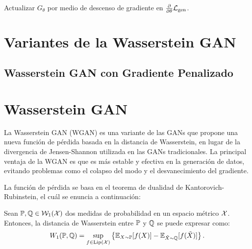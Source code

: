 {{\begin{algorithm}[ht!]
\begin{algorithmic}[1]
        \State Actualizar $G_\theta$ por medio de descenso de gradiente en $\pdv{\theta} \mathcal{L}_{\mathrm{gen}}$.
        \EndWhile
    \end{algorithmic}
\end{algorithm}

}  %

\section{Variantes de la Wasserstein GAN}\label{sec:variantes-de-la-Wasserstein-GAN}
{
    \subsection{Wasserstein GAN con Gradiente Penalizado}\label{ssec:}
    {

    }  %
}  %
\section{Wasserstein GAN}\label{sec:WGAN}
{
    La Wasserstein GAN (WGAN) \cite{arjovsky2017wasserstein} es una variante de las GANs que propone una nueva función de pérdida basada en la distancia de Wasserstein, en lugar de la divergencia de Jensen-Shannon utilizada en las GANs tradicionales. La principal ventaja de la WGAN es que es más estable y efectiva en la generación de datos, evitando problemas como el colapso del modo y el desvanecimiento del gradiente.

    La función de pérdida se basa en el teorema de dualidad de Kantorovich-Rubinstein, el cuál se enuncia a continuación:
    \begin{theorem}\label{thm:dualidad-kantorovich-rubinstein}
        Sean $\Prob, \ProbQ \in \WassersteinSpace[1]{\cX}$ dos medidas de probabilidad en un espacio métrico $\mathcal{X}$. Entonces, la distancia de Wasserstein entre $\Prob$ y $\ProbQ$ se puede expresar como:
        \begin{equation}\label{eq:dualidad-kantorovich-rubinstein}
            \Wasserstein[1]{\Prob}{\ProbQ} = \sup_{f \in \Lip[\cX]} \left\{ \Exp_{X\sim \Prob} [f(X)] - \Exp_{\tilde X \sim \ProbQ} [f(\tilde X)] \right\}.
        \end{equation}
    \end{theorem}

}}
